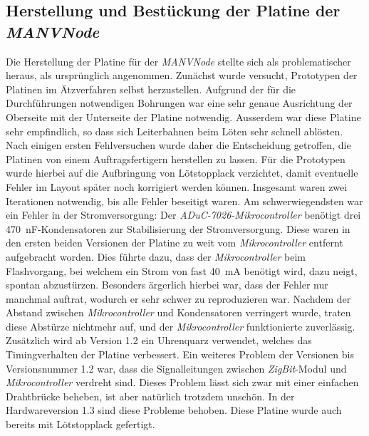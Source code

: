 \subsection{Herstellung und Bestückung der Platine der \emph{MANVNode}}
Die Herstellung der Platine für der \emph{MANVNode} stellte sich als problematischer heraus, als ursprünglich 
angenommen. Zunächst wurde versucht, Prototypen der Platinen im Ätzverfahren selbst herzustellen. Aufgrund der 
für die Durchführungen notwendigen Bohrungen war eine sehr genaue Ausrichtung der Oberseite mit der Unterseite 
der Platine notwendig. Ausserdem war diese Platine sehr empfindlich, so dass sich Leiterbahnen beim Löten
sehr schnell ablösten. Nach einigen ersten Fehlversuchen wurde daher die Entscheidung getroffen, die Platinen
von einem Auftragsfertigern herstellen zu lassen. Für die Prototypen wurde hierbei auf die Aufbringung von 
Lötstopplack verzichtet, damit eventuelle Fehler im Layout später noch korrigiert werden können. Insgesamt waren
zwei Iterationen notwendig, bis alle Fehler beseitigt waren. Am schwerwiegendsten war ein Fehler in der 
Stromversorgung: Der \emph{ADuC-7026-Mikrocontroller} benötigt drei 470~nF-Kondensatoren zur Stabilisierung der
Stromversorgung. Diese waren in den ersten beiden Versionen der Platine zu weit vom \emph{Mikrocontroller} entfernt 
aufgebracht worden. Dies führte dazu, dass der \emph{Mikrocontroller} beim Flashvorgang, bei welchem ein Strom von fast
40~mA benötigt wird, dazu neigt, spontan abzustürzen. Besonders ärgerlich hierbei war, dass der Fehler nur manchmal
auftrat, wodurch er sehr schwer zu reproduzieren war. Nachdem der Abstand zwischen \emph{Mikrocontroller} und Kondensatoren
verringert wurde, traten diese Abstürze nichtmehr auf, und der \emph{Mikrocontroller} funktionierte zuverlässig. Zusätzlich
wird ab Version 1.2 ein Uhrenquarz verwendet, welches das Timingverhalten der Platine verbessert. Ein weiteres
Problem der Versionen bis Versionsnummer 1.2 war, dass die Signalleitungen zwischen \emph{ZigBit}-Modul und
\emph{Mikrocontroller} verdreht sind. Dieses Problem lässt sich zwar mit einer einfachen Drahtbrücke beheben, ist aber
natürlich trotzdem unschön. In der Hardwareversion 1.3 sind diese Probleme behoben. Diese Platine wurde auch bereits
mit Lötstopplack gefertigt.  

